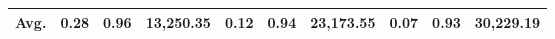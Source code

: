 \begin{table*}[!htb]
{\begin{tabular}{c|r|r|r|r|r|r|r|r|r}
\textbf{Avg.}                  & 0.28                                      & 0.96                                        & 13,250.35                                 & 0.12                                      & 0.94                                        & 23,173.55                                 & 0.07                                      & 0.93                                        & 30,229.19                                \\ \hline
\end{tabular}
}
\end{table*}